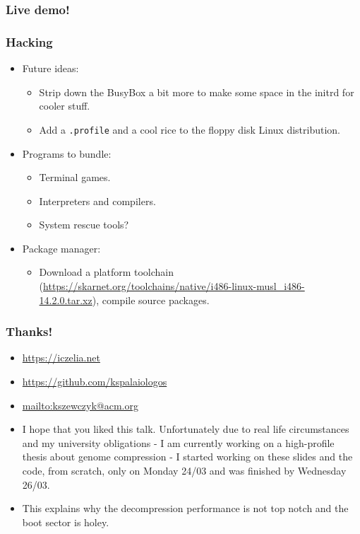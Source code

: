 \documentclass{beamer}
\begin{document}
\begin{frame}
\frametitle{Live demo!}
\end{frame}

\begin{frame}[t,fragile]
\frametitle{Hacking}
\begin{itemize}
  \item Future ideas:
  \begin{itemize}
    \item Strip down the BusyBox a bit more to make some space in the initrd for cooler stuff.
    \item Add a \verb|.profile| and a cool rice to the floppy disk Linux distribution.
  \end{itemize}
  \item Programs to bundle:
  \begin{itemize}
    \item Terminal games.
    \item Interpreters and compilers.
    \item System rescue tools?
  \end{itemize}
  \item Package manager:
  \begin{itemize}
    \item Download a platform toolchain (\url{https://skarnet.org/toolchains/native/i486-linux-musl_i486-14.2.0.tar.xz}), compile source packages.
  \end{itemize}
\end{itemize}
\end{frame}

\begin{frame}
\frametitle{Thanks!}
  \begin{itemize}
    \item \url{https://iczelia.net}
    \item \url{https://github.com/kspalaiologos}
    \item \url{mailto:kszewczyk@acm.org}
    \item I hope that you liked this talk. Unfortunately due to real life circumstances and my university obligations - I am currently working on a high-profile thesis about genome compression - I started working on these slides and the code, from scratch, only on Monday 24/03 and was finished by Wednesday 26/03.
    \item This explains why the decompression performance is not top notch and the boot sector is holey.
  \end{itemize}
\end{frame}
\end{document}
